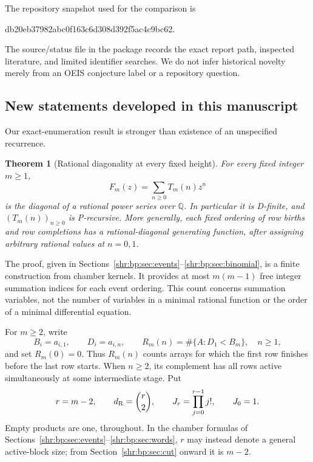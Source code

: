 \documentclass[11pt,letterpaper]{article}
\numberwithin{equation}{section}
\newtheorem{theorem}{Theorem}[section]
\theoremstyle{definition}
\newcommand{\Q}{\mathbb Q}
\newcommand{\1}{\mathbf 1}
\begin{document}
The repository snapshot used for the comparison is
\begin{center}\small\ttfamily
db20eb37982abc0f163c6d308d392f5ac4c9bc62.
\end{center}
The source/status file in the package records the exact report path,
inspected literature, and limited identifier searches. We do not infer
historical novelty merely from an OEIS conjecture label or a repository
question.

\subsection{New statements developed in this manuscript}
Our exact-enumeration result is stronger than existence of an unspecified
recurrence.
\begin{theorem}[Rational diagonality at every fixed height]
\label{shr:bp:thm:diagonal-main}
For every fixed integer $m\ge1$,
\[
 F_m(z)=\sum_{n\ge0}T_m(n)z^n
\]
is the diagonal of a rational power series over $\Q$. In particular it is
D-finite, and $(T_m(n))_{n\ge0}$ is P-recursive. More generally, each fixed
ordering of row births and row completions has a rational-diagonal generating
function, after assigning arbitrary rational values at $n=0,1$.
\end{theorem}

The proof, given in Sections~\ref{shr:bp:sec:events}--\ref{shr:bp:sec:binomial}, is a
finite construction from chamber kernels. It provides at most $m(m-1)$
free integer summation indices for each event ordering. This count concerns
summation variables, not the number of variables in a minimal rational
function or the order of a minimal differential equation.

For $m\ge2$, write
\begin{equation}
 B_i=a_{i,1},\qquad D_i=a_{i,n},\qquad
 R_m(n)=\#\{A:D_1<B_m\},\quad n\ge1,
 \label{shr:bp:eq:raredef}
\end{equation}
and set $R_m(0)=0$. Thus $R_m(n)$ counts arrays for which the first row
finishes before the last row starts. When $n\ge2$, its complement has all
rows active simultaneously at some intermediate stage.
Put
\begin{equation}
 r=m-2,\qquad d_{\rm R}=\binom r2,\qquad J_r=\prod_{j=0}^{r-1}j!,
 \qquad J_0=1.
 \label{shr:bp:eq:rnotation}
\end{equation}
Empty products are one, throughout. In the chamber formulas of
Sections~\ref{shr:bp:sec:events}--\ref{shr:bp:sec:words}, $r$ may instead denote a general
active-block size; from Section~\ref{shr:bp:sec:cut} onward it is $m-2$.
\end{document}
